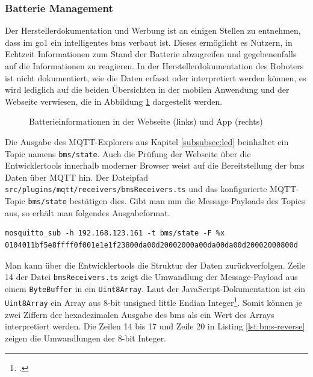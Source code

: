 \subsubsection{Batterie Management}
\label{subsubsec:batterie-management}

Der Herstellerdokumentation und Werbung ist an einigen Stellen zu entnehmen, dass im \gls{go1} ein intelligentes \gls{bms} verbaut ist.
Dieses ermöglicht es Nutzern, in Echtzeit Informationen zum Stand der Batterie abzugreifen und gegebenenfalls auf die Informationen
zu reagieren.
In der Herstellerdokumentation des Roboters ist nicht dokumentiert, wie die Daten erfasst oder interpretiert werden können,
es wird lediglich auf die beiden Übersichten in der mobilen Anwendung und der Webseite verwiesen, die in Abbildung \ref{fig:bms-app-web}
dargestellt werden.

\begin{figure}[h]
    \caption{Batterieinformationen in der Webseite (links) und App (rechts)}\label{fig:bms-app-web}
\end{figure}

Die Ausgabe des MQTT-Explorers aus Kapitel \ref{subsubsec:led} beinhaltet ein Topic namens \texttt{bms/\allowbreak state}.
Auch die Prüfung der Webseite über die Entwicklertools innerhalb moderner Browser weist auf die Bereitstellung der
\gls{bms} Daten über MQTT hin.
Der Dateipfad \texttt{src/\allowbreak plugins/\allowbreak mqtt/\allowbreak receivers/\allowbreak bms\allowbreak Receivers\allowbreak .ts}
und das konfigurierte MQTT-Topic \texttt{bms\allowbreak /state} bestätigen dies.
Gibt man nun die Message-Payloads des Topics aus, so erhält man folgendes Ausgabeformat.

\begin{lstlisting}
mosquitto_sub -h 192.168.123.161 -t bms/state -F %x
0104011bf5e8ffff0f001e1e1f23800da00d20002000a00da00da00d20002000800d
\end{lstlisting}

Man kann über die Entwicklertools die Struktur der Daten zurückverfolgen.
Zeile \num{14} der Datei \texttt{bmsReceivers.ts} zeigt die Umwandlung der Message-Payload aus einem \texttt{Byte\allowbreak Buffer} in ein \texttt{Uint8Array}.
Laut der JavaScript-Dokumentation ist ein \texttt{Uint8Array} ein Array aus \num{8}-bit unsigned little Endian Integer\footcite{uint8array}.
Somit können je zwei Ziffern der hexadezimalen Ausgabe des \gls{bms} als ein Wert des Arrays interpretiert werden.
Die Zeilen \num{14} bis \num{17} und Zeile \num{20} in Listing \ref{lst:bms-reverse} zeigen die Umwandlungen der \num{8}-bit Integer.

